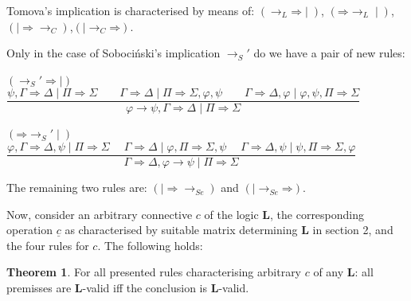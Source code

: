 \documentclass[10pt,a4paper]{article}
\theoremstyle{definition}
\newtheorem{theorem}{\textbf{Theorem}}
\newcommand{\3}{\vspace{.3in}}
\newcommand{\2}{\vspace{.2in}}
\newcommand{\1}{\vspace{.1in}}
\newcommand{\5}{\vspace{.05in}}
\begin{document}
Tomova's implication \cite{Heyting} is characterised by means of:
$(\mathord{\rightarrow_L}\mathord{\Rightarrow}\mid)$, $(\mathord{\Rightarrow}\mathord{\rightarrow_L}\mid)$, $(\mathord{\mid\Rightarrow}\mathord{\rightarrow_{C}})$,$(\mathord{\mid \rightarrow_{C}}\mathord{\Rightarrow})$.

Only in the case of Soboci\'nski's implication $\rightarrow_S'$ do we have a pair of new rules:

\begin{flushleft}
	{\footnotesize $(\mathord{\rightarrow_S'}\mathord{\Rightarrow\mid})$ \ $\dfrac{\psi, \Gamma
			\Rightarrow \Delta \mid \Pi\Rightarrow\Sigma \qquad \Gamma\Rightarrow\Delta \mid \Pi \Rightarrow \Sigma, \varphi, \psi \qquad \Gamma\Rightarrow\Delta, \varphi\mid \varphi, \psi, \Pi\Rightarrow\Sigma} {\varphi\rightarrow\psi, \Gamma
			\Rightarrow \Delta \mid \Pi\Rightarrow\Sigma}$}
\end{flushleft}

\begin{flushleft}
	{\footnotesize $(\mathord{\Rightarrow}\mathord{\rightarrow_S'\mid})$ \ $\dfrac{\varphi, \Gamma
			\Rightarrow \Delta, \psi \mid \Pi\Rightarrow\Sigma \;\quad \Gamma\Rightarrow\Delta \mid\varphi,
			\Pi \Rightarrow \Sigma, \psi \;\quad \Gamma\Rightarrow\Delta, \psi \mid \psi, \Pi\Rightarrow\Sigma, \varphi } {\Gamma
			\Rightarrow \Delta, \varphi\rightarrow\psi \mid \Pi\Rightarrow\Sigma}$}
\end{flushleft}


The remaining two rules are: $(\mathord{\mid\Rightarrow}\mathord{\rightarrow_{Se}})$ and $(\mathord{\mid \rightarrow_{Se}}\mathord{\Rightarrow})$.

\1

Now, consider an arbitrary connective $c$ of the logic {\bf L}, the corresponding operation $\underline{c}$ as characterised by suitable matrix determining {\bf L} in section 2, and the four rules for $c$. The following holds:

\begin{theorem} 	
	For all presented rules characterising arbitrary $c$ of any {\bf L}: all premisses are {\bf L}-valid iff the conclusion is {\bf L}-valid.
\end{theorem}
\end{document}
